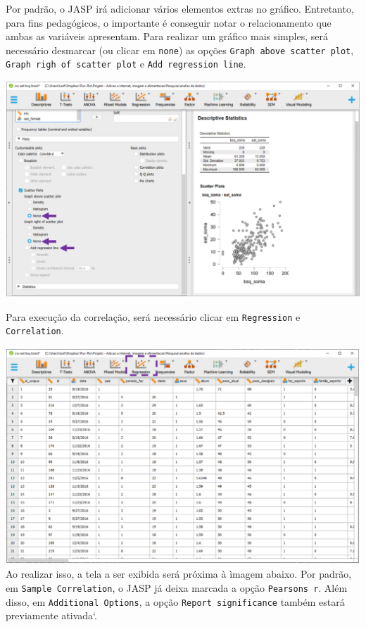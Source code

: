 \documentclass[
]{book}
\begin{document}
Por padrão, o JASP irá adicionar vários elementos extras no gráfico. Entretanto, para fins pedagógicos, o importante é conseguir notar o relacionamento que ambas as variáveis apresentam. Para realizar um gráfico mais simples, será necessário desmarcar (ou clicar em \texttt{none}) as opções \texttt{Graph\ above\ scatter\ plot}, \texttt{Graph\ righ\ of\ scatter\ plot} e \texttt{Add\ regression\ line}.

\includegraphics{./img/cap_correlacao_grafico_dispersao2.png}

Para execução da correlação, será necessário clicar em \texttt{Regression} e \texttt{Correlation}.

\includegraphics{./img/cap_correlacao_interface.png}
Ao realizar isso, a tela a ser exibida será próxima à ìmagem abaixo. Por padrão, em \texttt{Sample\ Correlation}, o JASP já deixa marcada a opção \texttt{Pearson\textquotesingle{}s\ r}. Além disso, em \texttt{Additional\ Options}, a opção \texttt{Report\ significance} também estará previamente ativada`.
\end{document}
